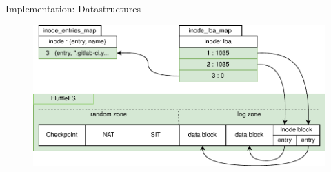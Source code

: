 \documentclass{beamer}
\begin{document}
\begin{frame}{Implementation: Datastructures}
	\begingroup
	\small
	\begin{figure}[h]
		\centering
			  \includegraphics[width=1.0\linewidth]{resources/images/fluffle-inode-sync.pdf}
	\end{figure}
	\endgroup
\end{frame}

\end{document}

